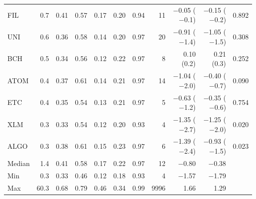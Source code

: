 \begin{tabular}{lrrrrrrrrrr}
FIL & 0.7 & 0.41 & 0.57 & 0.17 & 0.20 & 0.94 & 11 & \ensuremath{-}0.05 (\ensuremath{-}0.1) & \ensuremath{-}0.15 (\ensuremath{-}0.2) & 0.892\\
UNI & 0.6 & 0.36 & 0.58 & 0.14 & 0.20 & 0.97 & 20 & \ensuremath{-}0.91 (\ensuremath{-}1.4) & \ensuremath{-}1.05 (\ensuremath{-}1.5) & 0.308\\
BCH & 0.5 & 0.34 & 0.56 & 0.12 & 0.22 & 0.97 & 8 & 0.10 (0.2) & 0.21 (0.3) & 0.252\\
ATOM & 0.4 & 0.37 & 0.61 & 0.14 & 0.21 & 0.97 & 14 & \ensuremath{-}1.04 (\ensuremath{-}2.0) & \ensuremath{-}0.40 (\ensuremath{-}0.7) & 0.090\\
ETC & 0.4 & 0.35 & 0.54 & 0.13 & 0.21 & 0.97 & 5 & \ensuremath{-}0.63 (\ensuremath{-}1.2) & \ensuremath{-}0.35 (\ensuremath{-}0.6) & 0.754\\
XLM & 0.3 & 0.33 & 0.54 & 0.12 & 0.20 & 0.93 & 4 & \ensuremath{-}1.35 (\ensuremath{-}2.7) & \ensuremath{-}1.25 (\ensuremath{-}2.0) & 0.020\\
ALGO & 0.3 & 0.38 & 0.61 & 0.15 & 0.23 & 0.97 & 6 & \ensuremath{-}1.39 (\ensuremath{-}2.4) & \ensuremath{-}0.93 (\ensuremath{-}1.5) & 0.023\\
\midrule
Median & 1.4 & 0.41 & 0.58 & 0.17 & 0.22 & 0.97 & 12 & \ensuremath{-}0.80 & \ensuremath{-}0.38 & \\
Min & 0.3 & 0.33 & 0.46 & 0.12 & 0.18 & 0.93 & 4 & \ensuremath{-}1.57 & \ensuremath{-}1.79 & \\
Max & 60.3 & 0.68 & 0.79 & 0.46 & 0.34 & 0.99 & 9996 & 1.66 & 1.29 & \\
\bottomrule
\end{tabular}
